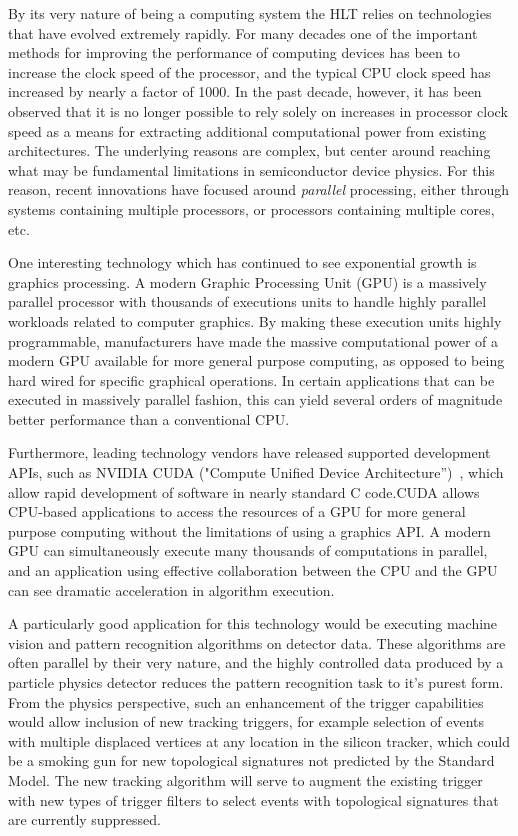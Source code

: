 \documentclass{JINST}
\begin{document}
By its very nature of being a computing system the HLT relies on technologies that have evolved
extremely rapidly.  For many decades one of the important methods for improving the performance of computing devices
has been to increase the clock speed of the processor, and the typical CPU clock speed has increased by nearly a factor of 1000.
In the past decade, however, it has been observed that it is no longer possible to rely solely on increases
in processor clock speed as a means for extracting additional computational power from existing architectures.
The underlying reasons are complex, but center around reaching what may be fundamental limitations in
semiconductor device physics.  For this reason, recent innovations have focused around {\em parallel}
processing, either through systems containing multiple processors, or processors containing multiple cores, etc.

One interesting technology which has continued to see exponential growth is graphics processing.  
A modern Graphic Processing Unit (GPU) is a massively parallel processor with thousands of executions units to handle highly parallel workloads
related to computer graphics.  By making these execution units highly programmable, manufacturers have made
the massive computational power of a modern GPU available for more general purpose computing,
as opposed to being hard wired for specific graphical operations.  In certain applications that can be executed in massively parallel
 fashion, this can yield several orders of magnitude better performance than a conventional CPU.

Furthermore, leading technology vendors have released supported development APIs, such as NVIDIA
CUDA ("Compute Unified Device Architecture'')~\cite{bib:CUDA}, which allow rapid development of
software in nearly standard C code.CUDA allows CPU-based applications to access the resources of a GPU 
for more general purpose computing without the limitations of using a graphics API.
 A modern GPU can simultaneously execute many thousands of computations in parallel, and an application using 
effective collaboration between the CPU and the GPU can see dramatic acceleration in algorithm execution.

A particularly good application for this technology would be executing machine vision
and pattern recognition algorithms on detector data.  These algorithms are often parallel
by their very nature, and the highly controlled data produced by a particle physics detector
reduces the pattern recognition task to it's purest form.  From the physics perspective,
such an enhancement of the trigger capabilities would allow inclusion of new tracking triggers, 
for example selection of events with multiple displaced
vertices at any location in the silicon tracker, which could be a smoking gun for new topological
signatures not predicted by the Standard Model.  The new tracking algorithm  will serve to
augment the existing trigger with new types of trigger filters to select events with topological signatures
that are currently suppressed. 
\end{document}
